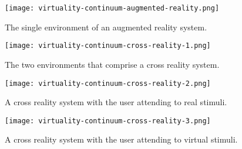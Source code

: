 \begin{figure}
	\begin{center}
		\texttt{[image: virtuality-continuum-augmented-reality.png]}
		\caption{The single environment of an augmented reality system.}
		\label{virtuality-continuum-augmented-reality}
	\end{center}
\end{figure}

\begin{figure}
	\begin{center}
		\texttt{[image: virtuality-continuum-cross-reality-1.png]}
		\caption{The two environments that comprise a cross reality system.}
		\label{virtuality-continuum-cross-reality-1}
	\end{center}
\end{figure}

\begin{figure}
	\begin{center}
		\texttt{[image: virtuality-continuum-cross-reality-2.png]}
		\caption{A cross reality system with the user attending to real stimuli.}
		\label{virtuality-continuum-cross-reality-2}
	\end{center}
\end{figure}

\begin{figure}
	\begin{center}
		\texttt{[image: virtuality-continuum-cross-reality-3.png]}
		\caption{A cross reality system with the user attending to virtual stimuli.}
		\label{virtuality-continuum-cross-reality-3}
	\end{center}
\end{figure}




